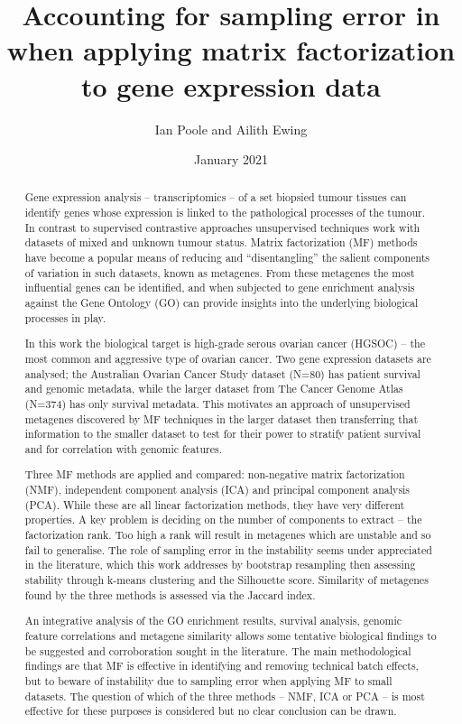 \documentclass[tikz, 11pt,a4paper,oneside,fleqn, draft]{article}
\title{Accounting for sampling error in when applying matrix factorization to gene expression data}
\author{Ian Poole and Ailith Ewing}
\date{January 2021}
\begin{document}
\maketitle

\begin{abstract}
Gene expression analysis -- transcriptomics -- of a set biopsied tumour tissues can identify genes whose expression is linked to the pathological processes of the tumour.  In contrast to supervised contrastive approaches unsupervised techniques work with datasets of mixed and unknown tumour status.   Matrix factorization (MF) methods have become a popular means of reducing and ``disentangling'' the salient components of variation in such datasets, known as metagenes.  From these metagenes the most influential genes can be identified, and when subjected to gene enrichment analysis against the Gene Ontology (GO) can provide insights into the underlying biological processes in play.

In this work the biological target is high-grade serous ovarian cancer (HGSOC) -- the most common and aggressive type of ovarian cancer.   Two gene expression datasets are analysed; the Australian Ovarian Cancer Study dataset (N=80) has patient survival and genomic metadata, while the larger dataset from The Cancer Genome Atlas (N=374) has only survival metadata.  This motivates an approach of unsupervised metagenes discovered by MF techniques in the larger dataset then transferring that information to the smaller dataset to test for their power to stratify patient survival and for correlation with genomic features.

Three MF methods are applied and compared: non-negative matrix factorization (NMF), independent component analysis (ICA) and principal component analysis (PCA).  While these are all linear factorization methods, they have very different properties.  A key problem is deciding on the number of components to extract -- the factorization rank.  Too high a rank will result in metagenes which are unstable and so fail to generalise.  The role of sampling error in the instability seems under appreciated in the literature, which this work addresses by bootstrap resampling then assessing  stability through k-means clustering and the Silhouette score.  Similarity of metagenes found by the three methods is assessed via the Jaccard index.

An integrative analysis of the GO enrichment results, survival analysis, genomic feature correlations and metagene similarity allows some tentative biological findings to be suggested and corroboration sought in the literature.  The main methodological findings are that MF is effective in identifying and removing technical batch effects, but to beware of instability due to sampling error when applying MF to small datasets.   The question of which of the three methods -- NMF, ICA or PCA -- is most effective for these purposes is considered but no clear conclusion can be drawn.

\end{abstract}
\end{document}
